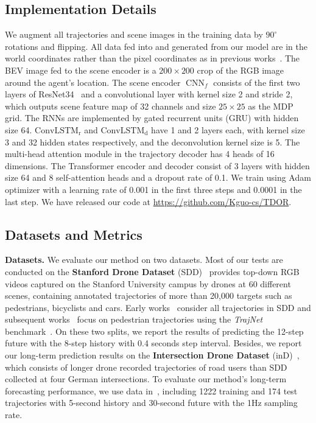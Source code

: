 \documentclass[10pt,twocolumn,letterpaper]{article}
\begin{document}
\subsection{Implementation Details}
We augment all trajectories and scene images in the training data by $90^{\circ}$ rotations and flipping. All data fed into and generated from our model are in the world coordinates rather than the pixel coordinates as in previous works~\cite{Sadeghian2018Trajnet,deo2020trajectory,mangalam2020not}. The BEV image fed to the scene encoder is a $200\times200$ crop of the RGB image around the agent's location. The scene encoder $\operatorname{CNN}_f$ consists of the first two layers of ResNet34~\cite{he2016deep} and a convolutional layer with kernel size 2 and stride 2, which outputs scene feature map of 32 channels and size $25\times25$ as the MDP grid. The RNNs are implemented by gated recurrent units (GRU) with hidden size 64. $\operatorname{ConvLSTM_r}$ and $\operatorname{ConvLSTM_d}$ have 1 and 2 layers each, with kernel size 3 and 32 hidden states respectively, and the deconvolution kernel size is 5. The multi-head attention module in the trajectory decoder has 4 heads of 16 dimensions. The Transformer encoder and decoder consist of 3 layers with hidden size 64 and 8 self-attention heads and a dropout rate of 0.1. We train using Adam optimizer with a learning rate of 0.001 in the first three steps and 0.0001 in the last step. We have released our code at \url{https://github.com/Kguo-cs/TDOR}. 

\subsection{Datasets and Metrics}

\textbf{Datasets.} We evaluate our method on two datasets. Most of our tests are conducted on the
\textbf{Stanford Drone Dataset} (SDD)~\cite{robicquet2016learning} provides top-down RGB videos captured on the Stanford University campus by drones at 60 different scenes, containing annotated trajectories of more than 20,000 targets such as pedestrians, bicyclists and cars. Early works~\cite{sadeghian2019sophie,dendorfer2020goal,liang2020garden} consider all trajectories in SDD and subsequent works~\cite{marchetti2020mantra,mangalam2020not,mangalam2021goals,zhao2021you} focus on pedestrian trajectories using the \textit{TrajNet} benchmark~\cite{Sadeghian2018Trajnet}. On these two splits,
we report the results of predicting the 12-step future with the 8-step history with 0.4 seconds step interval. Besides, we report our long-term prediction results on the \textbf{Intersection Drone Dataset} (inD)~\cite{inDdataset}, which consists of longer drone recorded trajectories of road users than SDD collected at four German intersections. To evaluate our method's long-term forecasting performance, we use data in~\cite{mangalam2021goals}, including 1222 training and 174 test trajectories with 5-second history and 30-second future with the 1Hz sampling rate.  
\end{document}
